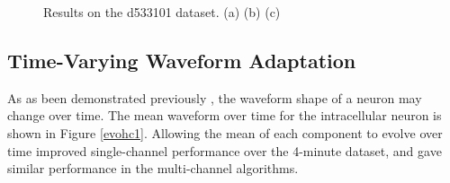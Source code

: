 \begin{center}
\begin{figure}[h!]
\begin{subfigure}[b]{.49\textwidth}
\caption{}
\label{overlapping}
\end{subfigure}
\caption{Results on the d533101 dataset.  (a)  (b)  (c) }
\end{figure}
\end{center}



\subsection{Time-Varying Waveform Adaptation} \label{sub:adapt}
As as been demonstrated previously \cite{calabrese2011kalman}, the waveform shape of a neuron may change over time.  The mean waveform over time for the intracellular neuron is shown in Figure \ref{evohc1}.  Allowing the mean of each component to evolve over time improved single-channel performance over the 4-minute dataset, and gave similar performance in the multi-channel algorithms.


